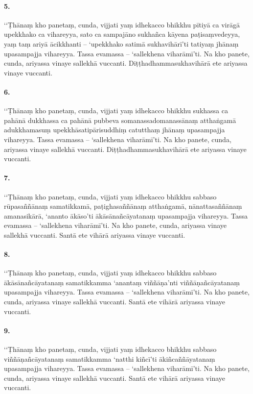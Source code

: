 \paragraph{5.} ‘‘Ṭhānaṃ kho panetaṃ, cunda, vijjati yaṃ idhekacco bhikkhu pītiyā ca virāgā upekkhako ca vihareyya, sato ca sampajāno sukhañca kāyena paṭisaṃvedeyya, yaṃ taṃ ariyā ācikkhanti – ‘upekkhako satimā sukhavihārī’ti tatiyaṃ jhānaṃ upasampajja vihareyya. Tassa evamassa – ‘sallekhena viharāmī’ti. Na kho panete, cunda, ariyassa vinaye sallekhā vuccanti. Diṭṭhadhammasukhavihārā ete ariyassa vinaye vuccanti.

\paragraph{6.} ‘‘Ṭhānaṃ kho panetaṃ, cunda, vijjati yaṃ idhekacco bhikkhu sukhassa ca pahānā dukkhassa ca pahānā pubbeva somanassadomanassānaṃ atthaṅgamā adukkhamasuṃ upekkhāsatipārisuddhiṃ catutthaṃ jhānaṃ upasampajja vihareyya. Tassa evamassa – ‘sallekhena viharāmī’ti. Na kho panete, cunda, ariyassa vinaye sallekhā vuccanti. Diṭṭhadhammasukhavihārā ete ariyassa vinaye vuccanti.

\paragraph{7.} ‘‘Ṭhānaṃ kho panetaṃ, cunda, vijjati yaṃ idhekacco bhikkhu sabbaso rūpasaññānaṃ samatikkamā, paṭighasaññānaṃ atthaṅgamā, nānattasaññānaṃ amanasikārā, ‘ananto ākāso’ti ākāsānañcāyatanaṃ upasampajja vihareyya. Tassa evamassa – ‘sallekhena viharāmī’ti. Na kho panete, cunda, ariyassa vinaye sallekhā vuccanti. Santā ete vihārā ariyassa vinaye vuccanti.

\paragraph{8.} ‘‘Ṭhānaṃ kho panetaṃ, cunda, vijjati yaṃ idhekacco bhikkhu sabbaso ākāsānañcāyatanaṃ samatikkamma ‘anantaṃ viññāṇa’nti viññāṇañcāyatanaṃ upasampajja vihareyya. Tassa evamassa – ‘sallekhena viharāmī’ti. Na kho panete, cunda, ariyassa vinaye sallekhā vuccanti. Santā ete vihārā ariyassa vinaye vuccanti.

\paragraph{9.} ‘‘Ṭhānaṃ kho panetaṃ, cunda, vijjati yaṃ idhekacco bhikkhu sabbaso viññāṇañcāyatanaṃ samatikkamma ‘natthi kiñcī’ti ākiñcaññāyatanaṃ upasampajja vihareyya. Tassa evamassa – ‘sallekhena viharāmī’ti. Na kho panete, cunda, ariyassa vinaye sallekhā vuccanti. Santā ete vihārā ariyassa vinaye vuccanti.

